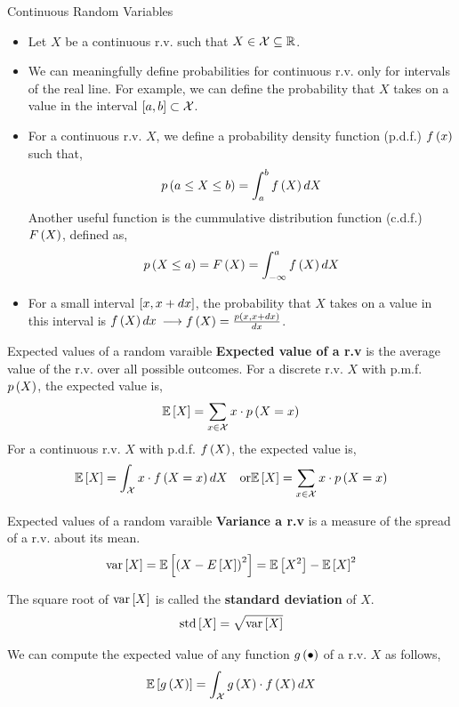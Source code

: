 \documentclass[aspectratio=169]{beamer}
\let\olditem\item
\renewcommand{\item}{\setlength{\itemsep}{\fill}\olditem}
\def\mb{\ensuremath\mathbb}
\def\mc{\ensuremath\mathcal}
\def\lp{\ensuremath\left(}
\def\rp{\ensuremath\right)}
\def\ls{\ensuremath\left[}
\def\rs{\ensuremath\right]}
\newcommand{\ct}[1]{\lp #1\rp}
\newcommand{\dt}[1]{\ls #1\rs}
\begin{document}
\begin{frame}{Continuous Random Variables}
  \begin{itemize}
    \item Let $X$ be a continuous r.v. such that $X \in \mc{X} \subseteq \mb{R}$.
    \item We can meaningfully define probabilities for continuous r.v. only for intervals of the real line. For example, we can define the probability that $X$ takes on a value in the interval $\ls a, b \rs \subset \mc{X}$.
    \item For a continuous r.v. $X$, we define a probability density function (p.d.f.) $f\ct{x}$ such that,
    \[ p\ct{a \leq X \leq b} = \int_{a}^{b} f\ct{X}dX \]
    Another useful function is the cummulative distribution function (c.d.f.) $F\ct{X}$, defined as,
    \[ p\ct{X \leq a} = F\ct{X} = \int_{-\infty}^{a} f\ct{X}dX \]
    \item For a small interval $\ls x, x + dx \rs$, the probability that $X$ takes on a value in this interval is $f\ct{X}dx$ $\longrightarrow f\ct{X} = \frac{p\ct{x, x+dx}}{dx}$.
  \end{itemize}
\end{frame}


\begin{frame}{Expected values of a random varaible}
  \textbf{Expected value of a r.v} is the average value of the r.v. over all possible outcomes. For a discrete r.v. $X$ with p.m.f. $p\ct{X}$, the expected value is,
  \[ \mb{E}\dt{X} = \sum_{x \in \mc{X}} x \cdot p\ct{X = x} \]
  For a continuous r.v. $X$ with p.d.f. $f\ct{X}$, the expected value is,
  \[ \mb{E}\dt{X} = \int_{\mc{X}} x \cdot f\ct{X = x} dX \quad \mathrm{or} \mb{E}\dt{X} = \sum_{x \in \mc{X}} x \cdot p\ct{X = x} \]
\end{frame}


\begin{frame}{Expected values of a random varaible}
  \textbf{Variance a r.v} is a measure of the spread of a r.v. about its mean.
  \[ \mathrm{var}\dt{X} = \mb{E}\dt{\ct{X - E\dt{X}}^2} = \mb{E}\dt{X^2} - \mb{E}\dt{X}^2 \]
  
  The square root of $\mathrm{var}\dt{X}$ is called the \textbf{standard deviation} of $X$.
  \[ \mathrm{std}\dt{X} = \sqrt{\mathrm{var}\dt{X} } \]

  We can compute the expected value of any function $g\ct{\bullet}$ of a r.v. $X$ as follows,
  \[ \mb{E}\dt{g\ct{X}} = \int_{\mc{X}} g\ct{X} \cdot f\ct{X} dX \]
\end{frame}
\end{document}
